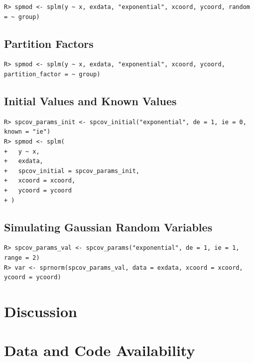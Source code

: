 \documentclass{article}
\begin{document}
\begin{verbatim}
R> spmod <- splm(y ~ x, exdata, "exponential", xcoord, ycoord, random = ~ group)
\end{verbatim}

\hypertarget{partition-factors}{%
\subsection{Partition Factors}\label{partition-factors}}

\begin{verbatim}
R> spmod <- splm(y ~ x, exdata, "exponential", xcoord, ycoord, partition_factor = ~ group)
\end{verbatim}

\hypertarget{initial-values-and-known-values}{%
\subsection{Initial Values and Known
Values}\label{initial-values-and-known-values}}

\begin{verbatim}
R> spcov_params_init <- spcov_initial("exponential", de = 1, ie = 0, known = "ie")
R> spmod <- splm(
+   y ~ x,
+   exdata,
+   spcov_initial = spcov_params_init,
+   xcoord = xcoord, 
+   ycoord = ycoord
+ )
\end{verbatim}

\hypertarget{simulating-gaussian-random-variables}{%
\subsection{Simulating Gaussian Random
Variables}\label{simulating-gaussian-random-variables}}

\begin{verbatim}
R> spcov_params_val <- spcov_params("exponential", de = 1, ie = 1, range = 2)
R> var <- sprnorm(spcov_params_val, data = exdata, xcoord = xcoord, ycoord = ycoord)
\end{verbatim}

\hypertarget{discussion}{%
\section{Discussion}\label{discussion}}

\hypertarget{data-and-code-availability}{%
\section*{Data and Code Availability}\label{data-and-code-availability}}
\end{document}
